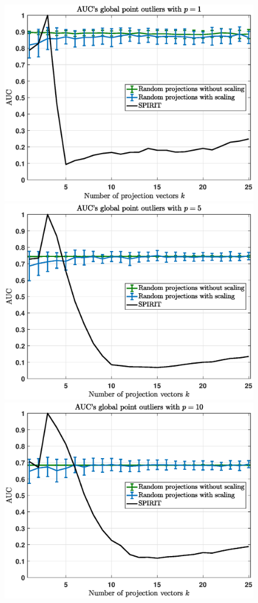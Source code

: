 \begin{figure}[h]
	\centering
	\vspace{-0.1cm}
	\includegraphics[scale=0.35]{analysis/AUCs_point}
	\includegraphics[scale=0.35]{analysis/AUCs_point1}\\
	\includegraphics[scale=0.35]{analysis/AUCs_point2}

\end{figure}
